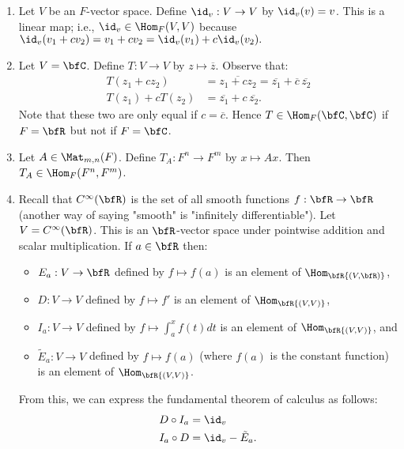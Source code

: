     \begin{example}
        \phantom{a}
        \begin{enumerate}[label = (\arabic*)]
            \item Let $V$ be an $F$-vector space. Define $\id_v : V \rightarrow V$ by $\id_v (v) = v$. This is a linear map; i.e., $\id_v \in \Hom_{F}{(V,V)}$ because $\id_v(v_1 + c v_2) = v_1 + c v_2 = \id_v(v_1) + c \id_v (v_2).$
            \item Let $V = \bfC$. Define $T:V \rightarrow V$ by $z \mapsto \overline{z}$. Observe that:
                \begin{equation*}
                \begin{split}
                    T(z_1 + c z_2) &= \overline{z_1 + c z_2} = \overline{z_1} + \overline{c} \hspace{2pt}\overline{z_2} \\
                    T(z_1) + c T(z_2) &= \overline{z_1} + c \hspace{2pt}\overline{z_2}.
                \end{split}
                \end{equation*}
            Note that these two are only equal if $c = \overline{c}$. Hence $T \in \Hom_{F}{(\bfC, \bfC)}$ if $F = \bfR$ but not if $F = \bfC$.
            \item Let $A \in \Mat_{m,n}(F)$. Define $T_A : F^n \rightarrow F^m$ by $x \mapsto Ax$. Then $T_A \in \Hom_F{(F^n , F^m)}$.
            \item Recall that $C^\infty(\bfR)$ is the set of all smooth functions $f:\bfR \rightarrow \bfR$ (another way of saying "smooth" is "infinitely differentiable"). Let $V = C^\infty(\bfR)$. This is an $\bfR$-vector space under pointwise addition and scalar multiplication. If $a \in \bfR$ then:
                \begin{itemize}
                    \item $E_a : V \rightarrow \bfR$ defined by $f \mapsto f(a)$ is an element of $\Hom_\bfR{(V,\bfR)}$,
                    \item $D:V \rightarrow V$ defined by $f \mapsto f'$ is an element of $\Hom_\bfR{(V,V)}$,
                    \item $I_a : V \rightarrow V$ defined by $f \mapsto \int_{a}^{x}f(t)dt$ is an element of $\Hom_\bfR{(V,V)}$, and
                    \item $\tilde{E}_a : V \rightarrow V$ defined by $f \mapsto f(a)$ (where $f(a)$ is the constant function) is an element of $\Hom_\bfR{(V,V)}$.
                \end{itemize}
            From this, we can express the fundamental theorem of calculus as follows:
                \begin{equation*}
                \begin{split}
                    D \circ I_a &= \id_v \\
                    I_a \circ D &= \id_v - \tilde{E}_a.
                \end{split}
                \end{equation*}
        \end{enumerate}
    \end{example}

